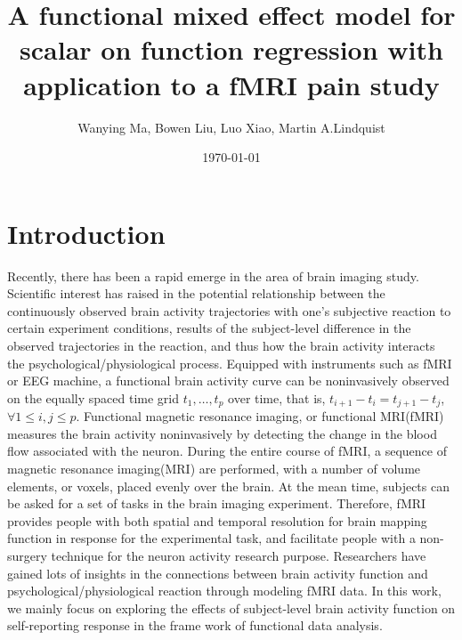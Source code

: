 \documentclass[12pt]{article}
\title{A functional mixed effect model for scalar on function regression with application to a fMRI pain study}
\author{Wanying Ma, Bowen Liu, Luo Xiao, Martin A.Lindquist}
\date{\today}
\begin{document}
\maketitle
\section{Introduction}
Recently, there has been a rapid emerge in the area of brain imaging study\cite{lindquist2008statistical, wager2008prefrontal,zipunnikov2011multilevel,huang2017two}. Scientific interest has raised in the potential relationship between the continuously observed brain activity trajectories with one's subjective reaction to certain experiment conditions\cite{lindquist2012functional}, results of the subject-level difference in the observed trajectories in the reaction, and thus how the brain activity interacts the psychological/physiological process. Equipped with instruments such as fMRI or EEG machine\cite{wang2016functional}, a functional brain activity curve can be noninvasively observed on the equally spaced time grid $t_1,\dots,t_p$ over time, that is, $t_{i+1}-t_{i}=t_{j+1}-t_j$, $\forall 1\le i,j\le p$. Functional magnetic resonance imaging, or functional MRI(fMRI) measures the brain activity noninvasively by detecting the change in the blood flow associated with the neuron. During the entire course of fMRI, a sequence of magnetic resonance imaging(MRI) are performed, with a number of volume elements, or voxels, placed evenly over the brain\cite{lindquist2008statistical}. At the mean time, subjects can be asked for a set of tasks in the brain imaging experiment. Therefore, fMRI provides people with both spatial and temporal resolution for brain mapping function in response for the experimental task, and facilitate people with a non-surgery technique for the neuron activity research purpose\cite{cohen2017computational}. Researchers have gained lots of insights in the connections between brain activity function and psychological/physiological reaction through modeling fMRI data. In this work, we mainly focus on exploring the effects of subject-level brain activity function on self-reporting response in the frame work of functional data analysis.
\end{document}
